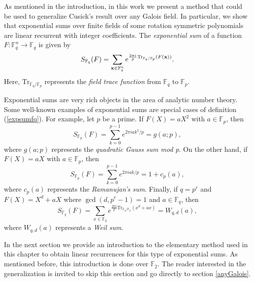 As mentioned in the introduction, in this work we present a method that could be used to generalize Cusick's result over any Galois field.   In particular, we show that exponential sums over finite fields of some rotation symmetric polynomials are linear recurrent with integer coefficients.   The {\it exponential sum} of a function $F:\mathbb{F}_q^n \to \mathbb{F}_q$ is given by
\begin{equation}
\label{expsumfq}
 S_{\mathbb{F}_q}(F)=\sum_{{\bf x}\in \mathbb{F}^n_q} e^{\frac{2\pi i}{p} \text{Tr}_{\mathbb{F}_q/\mathbb{F}_p}(F({\bf x}))}.
\end{equation}
Here, $\text{Tr}_{\mathbb{F}_q/\mathbb{F}_p}$ represents the {\it field trace function} from $\mathbb{F}_q$ to $\mathbb{F}_p$.   

Exponential sums are very rich objects in the area of analytic number theory.
Some well-known examples of exponential sums are special cases of definition (\ref{expsumfq}).  For example,  let $p$ be a prime.  If $F(X)=a X^2$ with $a\in \mathbb{F}_p$, then
\begin{equation}
S_{\mathbb{F}_p}(F) = \sum_{k=0}^{p-1} e^{2\pi i a k^2/p} = g(a;p),
\end{equation}
where $g(a;p)$ represents the {\it quadratic Gauss sum mod p}.  On the other hand, if $F(X)=a X$ with $a \in \mathbb{F}_p$, then
\begin{equation}
S_{\mathbb{F}_p}(F) = \sum_{k=0}^{p-1} e^{2\pi i a k/p} = 1+c_p(a),
\end{equation}
where $c_p(a)$ represents the {\it Ramanujan's sum}.  Finally, if $q=p^r$ and $F(X)=X^d+a X$ where $\gcd(d,p^r-1)=1$ and $a \in \mathbb{F}_q$, then
\begin{equation}
S_{\mathbb{F}_q}(F) = \sum_{x \in \mathbb{F}_q} e^{\frac{2\pi i}{p} \text{Tr}_{\mathbb{F}_q/\mathbb{F}_p}(x^d+ax)}=W_{q,d}(a),
\end{equation}
where $W_{q,d}(a)$ represents a {\it Weil sum}.

In the next section we provide an introduction to the elementary method used in this chapter to obtain linear recurrences for this type of exponential sums.  As mentioned before, this introduction is done over $\mathbb{F}_2$.  The reader interested in the generalization is invited to skip this section and go directly to section \ref{anyGalois}.


